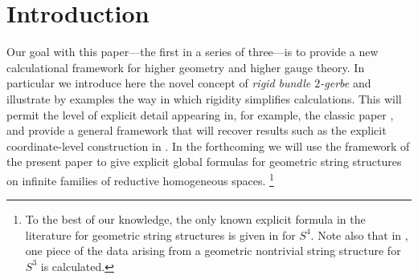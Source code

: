 \documentclass[12pt]{amsart}
\theoremstyle{plain}
\theoremstyle{definition}
\theoremstyle{remark}
\numberwithin{equation}{section}
\newcommand{\<}{\langle}
\renewcommand{\>}{\rangle}
\begin{document}
\maketitle

\tableofcontents




\section*{Introduction}



Our goal with this paper---the first in a series of three---is to provide a new calculational framework for higher geometry and higher gauge theory. 
In particular we introduce here the novel concept of {\em rigid bundle $2$-gerbe} and illustrate by examples the way in which
rigidity simplifies calculations.
This will permit the level of explicit detail appearing in, for example, the classic paper \cite{BPST}, and provide a general framework that will recover results such as the explicit coordinate-level construction in \cite[\S 5]{RSW_22}.
In the forthcoming \cite{rb2g_III} we will use the framework of the present paper to give explicit global formulas for geometric string structures \cite{Wal} on infinite families of reductive homogeneous spaces.%
\footnote{To the best of our knowledge, the only known explicit formula in the literature for geometric string structures is given in \cite[\S 5.3]{RSW_22} for $S^4$. 
Note also that in \cite[\S 6b]{Redden}, one piece of the data arising from a geometric nontrivial string structure for $S^3$ is calculated.}
\end{document}
